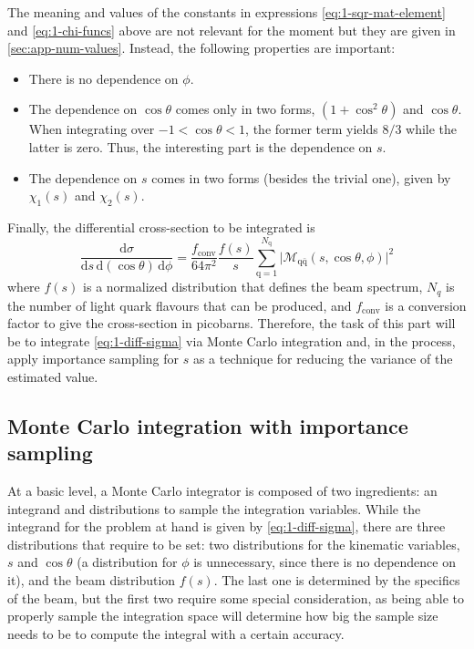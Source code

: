 The meaning and values of the constants in expressions \eqref{eq:1-sqr-mat-element} and \eqref{eq:1-chi-funcs} above are not relevant for the moment but they are given in \autoref{sec:app-num-values}. Instead, the following properties are important:
\begin{itemize}
    \item There is no dependence on $\phi$.
    
    \item The dependence on $\cos{\theta}$ comes only in two forms, $(1 + \cos^{2}{\theta})$ and $\cos{\theta}$. When integrating over $-1 < \cos{\theta} < 1$, the former term yields $8/3$ while the latter is zero. Thus, the interesting part is the dependence on $s$.

    \item The dependence on $s$ comes in two forms (besides the trivial one), given by $\chi_{1}(s)$ and $\chi_{2}(s)$.
\end{itemize}

Finally, the differential cross-section to be integrated is
\begin{equation}\label{eq:1-diff-sigma}
    \frac{\mathrm{d}\sigma}{\mathrm{d}s \, \mathrm{d}(\cos{\theta}) \, \mathrm{d}\phi} = \frac{f_{\text{conv}}}{64 \pi^{2}} \frac{f(s)}{s} \sum_{\mathrm{q} = 1}^{N_{\mathrm{q}}} \lvert \mathcal{M}_{\mathrm{q}\bar{\mathrm{q}}}(s, \cos{\theta}, \phi) \rvert^{2}
\end{equation}
where $f(s)$ is a normalized distribution that defines the beam spectrum, $N_{q}$ is the number of light quark flavours that can be produced, and $f_{\text{conv}}$ is a conversion factor to give the cross-section in picobarns. Therefore, the task of this part will be to integrate \eqref{eq:1-diff-sigma} via Monte Carlo integration and, in the process, apply importance sampling for $s$ as a technique for reducing the variance of the estimated value.

\subsection{Monte Carlo integration with importance sampling}

At a basic level, a Monte Carlo integrator is composed of two ingredients: an integrand and distributions to sample the integration variables. While the integrand for the problem at hand is given by \eqref{eq:1-diff-sigma}, there are three distributions that require to be set: two distributions for the kinematic variables, $s$ and $\cos{\theta}$ (a distribution for $\phi$ is unnecessary, since there is no dependence on it), and the beam distribution $f(s)$. The last one is determined by the specifics of the beam, but the first two require some special consideration, as being able to properly sample the integration space will determine how big the sample size needs to be to compute the integral with a certain accuracy.

